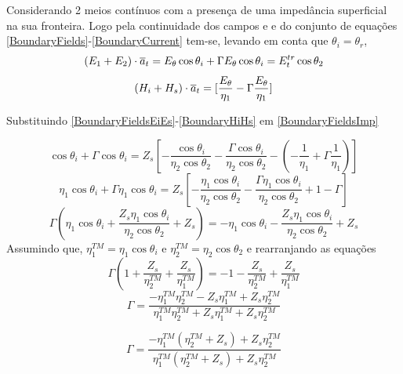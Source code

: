 \documentclass[
	12pt,				%
	openright,			%
	oneside,			%
	a4papey79r,			%
	english,			%
	brazil				%
	]{abntex2}
\begin{document}
Considerando 2 meios contínuos com a presença de uma impedância superficial na sua fronteira. Logo pela continuidade dos campos e e do conjunto de equações \ref{BoundaryFields}-\ref{BoundaryCurrent} tem-se, levando em conta que    ${\theta}_{i}={\theta}_{r}$,
\begin{equation}{\label{BoundaryFieldsEiEs}}
(E_1+E_2) \cdot \overline{a}_t=E_{\theta}\cos{\theta_{i}} +
  \Gamma E_{\theta}\cos{\theta_{i}} =E^{tr}_{t}\cos{\theta_{2}}
\end{equation}
\begin{equation}{\label{BoundaryHiHs}}
(H_i+H_s) \cdot \overline{a}_t=[ \frac{E_{\theta}}{\eta_1} -
  \Gamma \frac{E_{\theta} }{\eta_1} ]
\end{equation}

Substituindo \ref{BoundaryFieldsEiEs}-\ref{BoundaryHiHs} em \ref{BoundaryFieldsImp}

\begin{equation}
\cos{\theta_{i}} +
  \Gamma \cos{\theta_{i}} 
  =Z_s 
  [ -\frac{\cos{\theta_{i}}  }{\eta_2\cos{\theta_{2}} } - \frac{\Gamma \cos{\theta_{i}}  }{\eta_2\cos{\theta_{2}} } -
  (-\frac{1}{\eta_1} +\Gamma\frac{1}{\eta_1} )]
\end{equation}
\begin{equation}
\eta_1\cos{\theta_{i}} +
  \Gamma \eta_1\cos{\theta_{i}} 
  =Z_s 
  [ -\frac{\eta_1\cos{\theta_{i}}  }{\eta_2\cos{\theta_{2}} } - \frac{\Gamma \eta_1\cos{\theta_{i}}  }{\eta_2\cos{\theta_{2}} } +1-\Gamma]
\end{equation}
\begin{equation}
\Gamma(\eta_1\cos{\theta_{i}}+\frac{Z_s\eta_1\cos{\theta_{i}}  }{\eta_2\cos{\theta_{2}} }+Z_s)
= 
-\eta_1\cos{\theta_{i}} -\frac{Z_s\eta_1\cos{\theta_{i}}  }{\eta_2\cos{\theta_{2}} }+Z_s
\end{equation}
Assumindo que, $\eta_1^{TM}=\eta_1\cos{\theta_{i}}$ e $\eta_2^{TM}=\eta_2\cos{\theta_{2}}$ e rearranjando as equações
\begin{equation}
\Gamma(1+\frac{{Z_s} }{ \eta_2^{TM}}+\frac{Z_s}{\eta_1^{TM}})
= 
-1 -\frac{Z_s  }{\eta_2^{TM} }+\frac{Z_s}{\eta_1^{TM}}
\end{equation}
\begin{equation}
\Gamma=\frac{-\eta_1^{TM}\eta_2^{TM} -Z_s \eta_1^{TM} +{Z_s}\eta_2^{TM}}
{\eta_1^{TM}\eta_2^{TM}+Z_s \eta_1^{TM} +{Z_s}\eta_2^{TM}}
\end{equation}

\begin{equation}
\Gamma=\frac{-\eta_1^{TM}(\eta_2^{TM}+Z_s) +Z_s \eta_2^{TM} }
{\eta_1^{TM}(\eta_2^{TM}+Z_s) +Z_s \eta_2^{TM}}
\end{equation}
\end{document}
